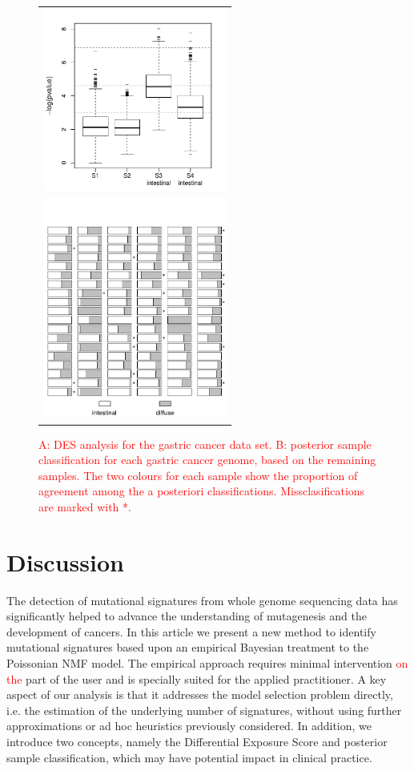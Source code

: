 \documentclass{bioinfo}
\begin{document}
\begin{figure}[t!]
 \centering
  \begin{tabular}{c}
  \includegraphics[width=6cm]{figs/DES_Mcur_so_Lauren_opp_bw} \\
  \includegraphics[width=6cm]{figs/Classific_result_114_GC_copy}
  \end{tabular}
  \caption{\textrm{%
   \textcolor{red}{A: DES analysis for the gastric cancer data set. B: posterior sample classification for each gastric cancer genome, based on the remaining samples. The two colours for each sample show the proportion of agreement among the a posteriori classifications. Missclasifications are marked with *.}
   }
  }
  \label{fig:gastric_DES_Class}
\end{figure}



\section{Discussion}
The detection of mutational signatures from whole genome sequencing
data has significantly helped to advance the understanding of
mutagenesis and the development of cancers. In this article we present
a new method to identify mutational signatures based upon an empirical
Bayesian treatment to the Poissonian NMF model. The empirical approach
requires minimal intervention \textcolor{red}{on the} part of the user
and is specially suited for the applied practitioner.  A key aspect of
our analysis is that it addresses the model selection problem
directly, i.e. the estimation of the underlying number of signatures,
without using further approximations or ad hoc heuristics previously
considered. In addition, we introduce two concepts, namely the
Differential Exposure Score and posterior sample classification, which
may have potential impact in clinical practice.
\end{document}
